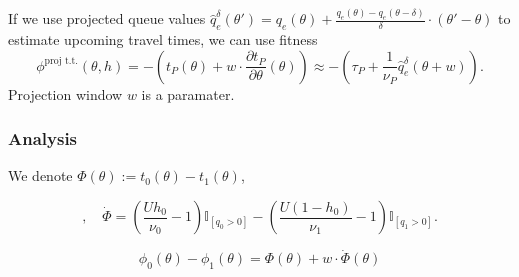 \documentclass[12pt]{article}
\begin{document}
If we use projected queue values $\hat{q}^{\delta}_e(\theta') = q_e(\theta) + \frac{q_e(\theta) - q_e(\theta - \delta)}{\delta} \cdot (\theta' - \theta)$ to estimate upcoming travel times, we can use fitness $$ \phi^{\text{proj t.t.}}(\theta, h) = -(t_P(\theta) + w \cdot \frac{\partial t_P}{\partial \theta}(\theta)) \approx - ( \tau_P + \frac{1}{\nu_P} \hat{q}^{\delta}_e(\theta + w) ). $$  Projection window $w$ is a paramater. 

\subsubsection*{Analysis}

We denote $\Phi(\theta) := t_0(\theta) - t_1(\theta)$, 

 $$ , \quad \dot{\Phi} = \left(\frac{U h_0}{\nu_0} - 1 \right) \mathbb{I}_{[q_0 > 0]} - \left(\frac{U (1 - h_0)}{\nu_1} - 1 \right)\mathbb{I}_{[q_1 > 0]} . $$
 
 $$ \phi_0(\theta) - \phi_1(\theta) = \Phi(\theta) + w \cdot \dot{\Phi} (\theta)$$
 
\end{document}
